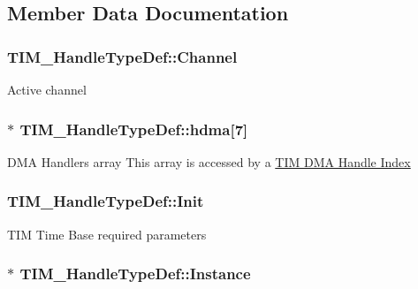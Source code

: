 \subsection{Member Data Documentation}
\hypertarget{struct_t_i_m___handle_type_def_ae9c5a11c1f5b27c808c0aca453e63870}{
\subsubsection[{Channel}]{ T\-I\-M\-\_\-\-Handle\-Type\-Def\-::\-Channel}}\label{struct_t_i_m___handle_type_def_ae9c5a11c1f5b27c808c0aca453e63870}
Active channel \hypertarget{struct_t_i_m___handle_type_def_a15338c71de82fa178c685be868e694bd}{
\subsubsection[{hdma}]{$\ast$ T\-I\-M\-\_\-\-Handle\-Type\-Def\-::hdma\mbox{[}7\mbox{]}}}\label{struct_t_i_m___handle_type_def_a15338c71de82fa178c685be868e694bd}
D\-M\-A Handlers array This array is accessed by a \hyperlink{group___t_i_m___d_m_a___handle__index}{T\-I\-M D\-M\-A Handle Index} \hypertarget{struct_t_i_m___handle_type_def_a8b2e61c3c4128e62cb7be7d35048152e}{
\subsubsection[{Init}]{ T\-I\-M\-\_\-\-Handle\-Type\-Def\-::\-Init}}\label{struct_t_i_m___handle_type_def_a8b2e61c3c4128e62cb7be7d35048152e}
T\-I\-M Time Base required parameters \hypertarget{struct_t_i_m___handle_type_def_ad0c5f736a15f6d8d14724854c8133bcc}{
\subsubsection[{Instance}]{$\ast$ T\-I\-M\-\_\-\-Handle\-Type\-Def\-::\-Instance}}\label{struct_t_i_m___handle_type_def_ad0c5f736a15f6d8d14724854c8133bcc}
